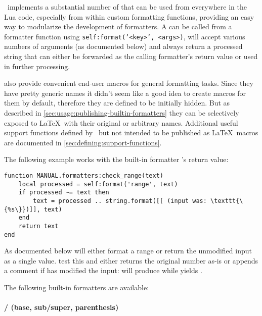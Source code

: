 \documentclass[12pt]{scrartcl}
\begin{document}
\luatemplates\ implements a substantial number of  that can be used from everywhere in the Lua
code, especially from within custom formatting functions, providing an easy way
to modularize the development of formatters.  A  can be
called from a formatter function using \texttt{self:format('<key>',
<args>)}, will accept various numbers of arguments (as documented below) and
always return a processed string that can either be forwarded as the calling
formatter's return value or used in further processing.

 also provide convenient end-user
macros for general formatting tasks.  Since they have pretty generic names it
didn't seem like a good idea to create macros for them by default, therefore
they are defined to be initially hidden.  But as described in
\vref{sec:usage:publishing-builtin-formatters} they can be selectively exposed
to \LaTeX\ with their original or arbitrary names.  Additional useful support
functions defined by \luatemplates\ but not intended to be published as \LaTeX\
macros are documented in \vref{sec:defining:support-functions}.

The following example works with the built-in formatter 's return value:

\begin{verbatim}
function MANUAL.formatters:check_range(text)
    local processed = self:format('range', text)
    if processed ~= text then
        text = processed .. string.format([[ (input was: \texttt{\{%s\}})]], text)
    end
    return text
end
\end{verbatim}

\noindent As documented below  will either format a range or
return the unmodified input as a single value.  \cmd{checkRange} test this and
either returns the original number as-is or appends a comment if \luavar{range}
has modified the input: \texttt{} will produce
\checkRange{5} while \texttt{} yields .


\medskip

\noindent
The following built-in formatters are available:

\paragraph{ /  (base, sub/super, parenthesis)}
\end{document}
